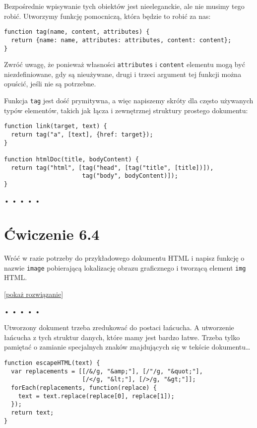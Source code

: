  
Bezpośrednie wpisywanie tych obiektów jest nieeleganckie, ale nie musimy tego robić. Utworzymy funkcję pomocniczą, która będzie to robić za nas:

  
\begin{verbatim} 
function tag(name, content, attributes) {
  return {name: name, attributes: attributes, content: content};
}
 \end{verbatim}
  
Zwróć uwagę, że ponieważ własności \texttt{attributes} i \texttt{content} elementu mogą być niezdefiniowane, gdy są nieużywane, drugi i trzeci argument tej funkcji można opuścić, jeśli nie są potrzebne.

  
Funkcja \texttt{tag} jest dość prymitywna, a więc napiszemy skróty dla często używanych typów elementów, takich jak łącza i zewnętrznej struktury prostego dokumentu:

  
\begin{verbatim} 
function link(target, text) {
  return tag("a", [text], {href: target});
}

function htmlDoc(title, bodyContent) {
  return tag("html", [tag("head", [tag("title", [title])]),
                      tag("body", bodyContent)]);
}
 \end{verbatim}


\begin{center}
• • • • •
\end{center}

  
\section*{Ćwiczenie 6.4}
\label{sec:6.4}
  
    
Wróć w razie potrzeby do przykładowego dokumentu HTML i napisz funkcję o nazwie \texttt{image} pobierającą lokalizację obrazu graficznego i tworzącą element \texttt{img} HTML.

  
[\hyperref[sol:6.4]{pokaż rozwiązanie}]
  


\begin{center}
• • • • •
\end{center}

  
Utworzony dokument trzeba zredukować do postaci łańcucha. A utworzenie łańcucha z tych struktur danych, które mamy jest bardzo łatwe. Trzeba tylko pamiętać o zamianie specjalnych znaków znajdujących się w tekście dokumentu…

  
\begin{verbatim} 
function escapeHTML(text) {
  var replacements = [[/&/g, "&amp;"], [/"/g, "&quot;"],
                      [/</g, "&lt;"], [/>/g, "&gt;"]];
  forEach(replacements, function(replace) {
    text = text.replace(replace[0], replace[1]);
  });
  return text;
}
 \end{verbatim}
  
